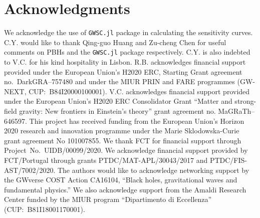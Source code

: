 \documentclass[
reprint,           %
superscriptaddress,%
amsmath,           %
amssymb,           %
aps,               %
prd,               %
notitlepage,       %
floatfix,          %
nofootinbib %
]{revtex4-1}
\begin{document}
\section*{Acknowledgments}
We acknowledge the use of \texttt{GWSC.jl} package \cite{GWSC} in calculating the sensitivity curves. C.Y. would like to thank Qing-guo Huang and Zu-cheng Chen for useful comments on PBHs and the \texttt{GWSC.jl} package respectively. C.Y. is also indebted to V.C. for his kind hospitality in Lisbon. 
%
R.B. acknowledges financial support provided under the European Union's H2020 ERC, Starting Grant agreement no.~DarkGRA--757480 and under the MIUR PRIN and FARE programmes (GW-NEXT, CUP:~B84I20000100001). 
%
V.C. acknowledges financial support provided under the European Union's H2020 ERC 
Consolidator Grant ``Matter and strong-field gravity: New frontiers in Einstein's 
theory'' grant agreement no. MaGRaTh--646597.
%
This project has received funding from the European Union's Horizon 2020 research and innovation programme under the Marie Sklodowska-Curie grant agreement No 101007855.
%
We thank FCT for financial support through Project~No.~UIDB/00099/2020.
%
We acknowledge financial support provided by FCT/Portugal through grants PTDC/MAT-APL/30043/2017 and PTDC/FIS-AST/7002/2020.
%
The authors would like to acknowledge networking support by the GWverse COST Action 
CA16104, ``Black holes, gravitational waves and fundamental physics.''
%
We also acknowledge support from the Amaldi Research Center funded by the MIUR program ``Dipartimento di Eccellenza'' (CUP:~B81I18001170001).
	

	
\end{document}
